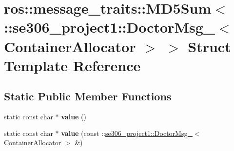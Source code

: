 \hypertarget{structros_1_1message__traits_1_1MD5Sum_3_01_1_1se306__project1_1_1DoctorMsg___3_01ContainerAllocator_01_4_01_4}{\section{ros\-:\-:message\-\_\-traits\-:\-:M\-D5\-Sum$<$ \-:\-:se306\-\_\-project1\-:\-:Doctor\-Msg\-\_\-$<$ Container\-Allocator $>$ $>$ Struct Template Reference}
\label{structros_1_1message__traits_1_1MD5Sum_3_01_1_1se306__project1_1_1DoctorMsg___3_01ContainerAllocator_01_4_01_4}
}
\subsection*{Static Public Member Functions}
\begin{DoxyCompactItemize}
\item 
\hypertarget{structros_1_1message__traits_1_1MD5Sum_3_01_1_1se306__project1_1_1DoctorMsg___3_01ContainerAllocator_01_4_01_4_a5f3b0909336db6fd963a5c764264336c}{static const char $\ast$ {\bfseries value} ()}\label{structros_1_1message__traits_1_1MD5Sum_3_01_1_1se306__project1_1_1DoctorMsg___3_01ContainerAllocator_01_4_01_4_a5f3b0909336db6fd963a5c764264336c}

\item 
\hypertarget{structros_1_1message__traits_1_1MD5Sum_3_01_1_1se306__project1_1_1DoctorMsg___3_01ContainerAllocator_01_4_01_4_a022fb5d69dca3e28f1d49ccf25d85755}{static const char $\ast$ {\bfseries value} (const \-::\hyperlink{structse306__project1_1_1DoctorMsg__}{se306\-\_\-project1\-::\-Doctor\-Msg\-\_\-}$<$ Container\-Allocator $>$ \&)}\label{structros_1_1message__traits_1_1MD5Sum_3_01_1_1se306__project1_1_1DoctorMsg___3_01ContainerAllocator_01_4_01_4_a022fb5d69dca3e28f1d49ccf25d85755}

\end{DoxyCompactItemize}
